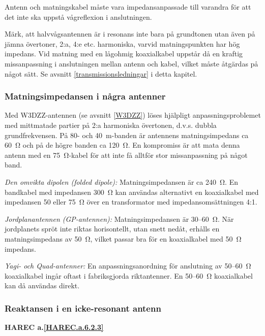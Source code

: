Antenn och matningskabel måste vara impedansanpassade till varandra
för att det inte ska uppstå vågreflexion i anslutningen.

Märk, att halvvågsantennen är i resonans inte bara på grundtonen utan
även på jämna övertoner, 2:a, 4:e etc. harmoniska, varvid
matningspunkten har hög impedans. Vid matning med en lågohmig
koaxialkabel uppstår då en kraftig missanpassning i anslutningen
mellan antenn och kabel, vilket måste åtgärdas på något sätt. Se
avsnitt \ref{transmissionsledningar} i detta kapitel.

\subsubsection{Matningsimpedansen i några antenner}

Med W3DZZ-antennen (se avsnitt \ref{W3DZZ}) löses hjälpligt anpassningsproblemet med
mittmatade partier på 2:a harmoniska övertonen, d.v.s. dubbla
grundfrekvensen. På 80- och 40~m-banden är antennens matningsimpedans
ca 60~Ω och på de högre banden ca 120~Ω. En kompromiss är att mata
denna antenn med en 75~Ω-kabel för att inte få alltför stor
missanpassning på något band.

\emph{Den omvikta dipolen (folded dipole):}
Matningsimpedansen är ca 240~Ω. En bandkabel med impedansen 300~Ω kan
användas alternativt en koaxialkabel med impedansen 50 eller 75~Ω över
en transformator med impedansomsättningen 4:1.

\emph{Jordplanantennen (GP-antennen):} Matningsimpedansen är 30--60~Ω.
När jordplanets spröt inte riktas horisontellt, utan snett nedåt,
erhålls en matningsimpedans av 50~Ω, vilket passar bra för en
koaxialkabel med 50~Ω impedans.

\emph{Yagi- och Quad-antenner:} En anpassningsanordning för anslutning
av 50--60~Ω koaxialkabel ingår oftast i fabriksgjorda
riktantenner. En 50--60~Ω koaxialkabel kan då användas direkt.

\subsubsection{Reaktansen i en icke-resonant antenn}
\textbf{
HAREC a.\ref{HAREC.a.6.2.3}\label{myHAREC.a.6.2.3}
}

